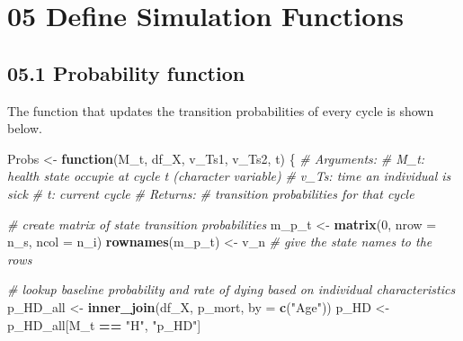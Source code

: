 \documentclass[
]{article}
\newenvironment{Shaded}{\begin{snugshade}}{\end{snugshade}}
\newcommand{\CommentTok}[1]{\textcolor[rgb]{0.56,0.35,0.01}{\textit{#1}}}
\newcommand{\ControlFlowTok}[1]{\textcolor[rgb]{0.13,0.29,0.53}{\textbf{#1}}}
\newcommand{\DataTypeTok}[1]{\textcolor[rgb]{0.13,0.29,0.53}{#1}}
\newcommand{\DecValTok}[1]{\textcolor[rgb]{0.00,0.00,0.81}{#1}}
\newcommand{\KeywordTok}[1]{\textcolor[rgb]{0.13,0.29,0.53}{\textbf{#1}}}
\newcommand{\NormalTok}[1]{#1}
\newcommand{\OperatorTok}[1]{\textcolor[rgb]{0.81,0.36,0.00}{\textbf{#1}}}
\newcommand{\StringTok}[1]{\textcolor[rgb]{0.31,0.60,0.02}{#1}}
\begin{document}
\hypertarget{define-simulation-functions}{%
\section{05 Define Simulation
Functions}\label{define-simulation-functions}}

\hypertarget{probability-function}{%
\subsection{05.1 Probability function}\label{probability-function}}

The function that updates the transition probabilities of every cycle is
shown below.

\begin{Shaded}
\begin{Highlighting}[]
\NormalTok{Probs <-}\StringTok{ }\ControlFlowTok{function}\NormalTok{(M_t, df_X, v_Ts1, v_Ts2, t) \{ }
  \CommentTok{# Arguments:}
    \CommentTok{# M_t: health state occupie at cycle t (character variable)}
    \CommentTok{# v_Ts: time an individual is sick}
    \CommentTok{# t:     current cycle }
  \CommentTok{# Returns: }
    \CommentTok{# transition probabilities for that cycle}
  
  \CommentTok{# create matrix of state transition probabilities}
\NormalTok{  m_p_t           <-}\StringTok{ }\KeywordTok{matrix}\NormalTok{(}\DecValTok{0}\NormalTok{, }\DataTypeTok{nrow =}\NormalTok{ n_s, }\DataTypeTok{ncol =}\NormalTok{ n_i) }
  \KeywordTok{rownames}\NormalTok{(m_p_t) <-}\StringTok{  }\NormalTok{v_n  }\CommentTok{# give the state names to the rows}
  
  \CommentTok{# lookup baseline probability and rate of dying based on individual characteristics}
\NormalTok{  p_HD_all <-}\StringTok{ }\KeywordTok{inner_join}\NormalTok{(df_X, p_mort, }\DataTypeTok{by =} \KeywordTok{c}\NormalTok{(}\StringTok{"Age"}\NormalTok{))}
\NormalTok{  p_HD     <-}\StringTok{ }\NormalTok{p_HD_all[M_t }\OperatorTok{==}\StringTok{ "H"}\NormalTok{, }\StringTok{"p_HD"}\NormalTok{]}
  

\end{Highlighting}
\end{Shaded}
\end{document}
